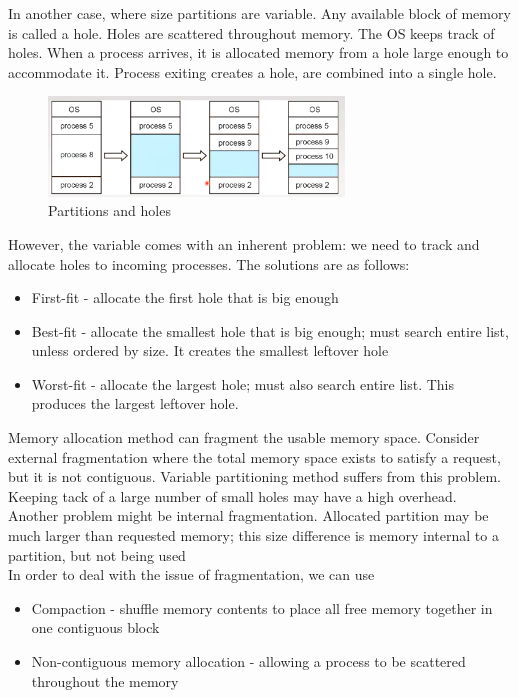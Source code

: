 \documentclass[a4paper]{article}
\theoremstyle{plain}
\theoremstyle{definition}
\newtheorem{defn}{Definition}[section]
\theoremstyle{remark}
\begin{document}
\begin{tcolorbox}[colback=black!3!white,colframe=black!60!white,title=\begin{defn}Contiguous Memory Allocation \label{Contiguous Memory Allocation}\end{defn}]
In another case, where size partitions are variable. Any available block of memory is called a hole. Holes are scattered throughout memory. The OS keeps track of holes. When a process arrives, it is allocated memory from a hole large enough to accommodate it. Process exiting creates a hole, are combined into a single hole. 
\begin{figure}[H]
	\centering
	\includegraphics[width=0.7\textwidth]{seventytwo.png}
	\caption{Partitions and holes}
	\label{fig:seventytwo-png}
\end{figure}
However, the variable comes with an inherent problem: we need to track and allocate holes to incoming processes. The solutions are as follows:
\begin{itemize}
	\item First-fit - allocate the first hole that is big enough
	\item Best-fit - allocate the smallest hole that is big enough; must search entire list, unless ordered by size. It creates the smallest leftover hole
	\item Worst-fit - allocate the largest hole; must also search entire list. This produces the largest leftover hole. 
\end{itemize}
\end{tcolorbox}
\begin{tcolorbox}[colback=black!3!white,colframe=black!60!white,title=\begin{defn}Fragmentation \label{Fragmentation}\end{defn}]
Memory allocation method can fragment the usable memory space. Consider external fragmentation where the total memory space exists to satisfy a request, but it is not contiguous. Variable partitioning method suffers from this problem. Keeping tack of a large number of small holes may have a high overhead. \\
Another problem might be internal fragmentation. Allocated partition may be much larger than requested memory; this size difference is memory internal to a partition, but not being used  \\
In order to deal with the issue of fragmentation, we can use
\begin{itemize}
	\item Compaction - shuffle memory contents to place all free memory together in one contiguous block
	\item Non-contiguous memory allocation - allowing a process to be scattered throughout the memory
\end{itemize}
\end{tcolorbox}
\end{document}
